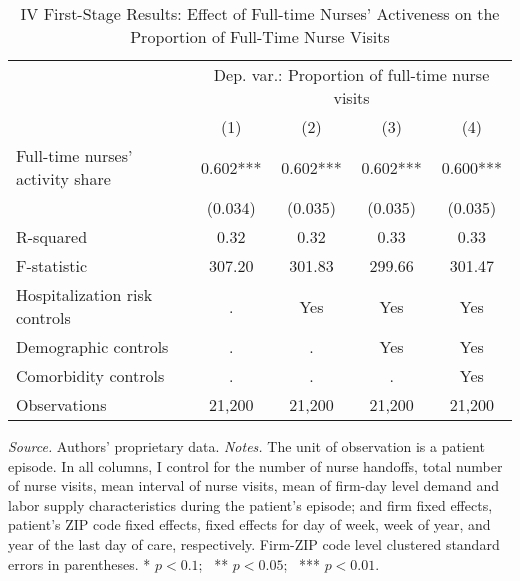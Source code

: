 \documentclass[final,12pt]{article}
\begin{document}
\begin{singlespace}
\newpage
\begin{table}[H]
\begin{threeparttable}
\footnotesize
\setlength\tabcolsep{10pt}
\centering
\caption{IV First-Stage Results: Effect of Full-time Nurses' Activeness on the Proportion of Full-Time Nurse Visits}
\label{tab:iv_onquality_firststage}
\def\sym#1{\ifmmode^{#1}\else\(^{#1}\)\fi}
\begin{tabular}{l*{4}{c}}
\toprule
&\multicolumn{4}{c}{Dep. var.: Proportion of full-time nurse visits}\\
 & (1) & (2) & (3) & (4) \\
\midrule
Full-time nurses' activity share&       0.602***&       0.602***&       0.602***&       0.600***\\
                    &     (0.034)   &     (0.035)   &     (0.035)   &     (0.035)   \\
R-squared           &        0.32   &        0.32   &        0.33   &        0.33   \\
F-statistic         &      307.20   &      301.83   &      299.66   &      301.47   \\
\midrule
Hospitalization risk controls & . & Yes & Yes & Yes \\
Demographic controls & . & . & Yes & Yes \\
 Comorbidity controls & . & . & . & Yes \\
Observations & 21,200 & 21,200 & 21,200 & 21,200 \\
\bottomrule
\end{tabular}
	\begin{tablenotes}
	\footnotesize
	\item \emph{Source.} Authors' proprietary data.
 \emph{Notes.}
	The unit of observation is a patient episode.
	In all columns, I control for
	the number of nurse handoffs, total number of nurse visits, mean interval of nurse visits, mean of firm-day level demand and labor supply characteristics during the patient's episode; and firm fixed effects, patient's ZIP code fixed effects, fixed effects for day of week, week of year, and year of the last day of care, respectively.
	Firm-ZIP code level clustered standard errors in parentheses.
	* $p< 0.1$; \ ** $p< 0.05$; \ *** $p < 0.01$.
	\end{tablenotes}
\end{threeparttable}
\end{table}




\end{singlespace}
\end{document}
